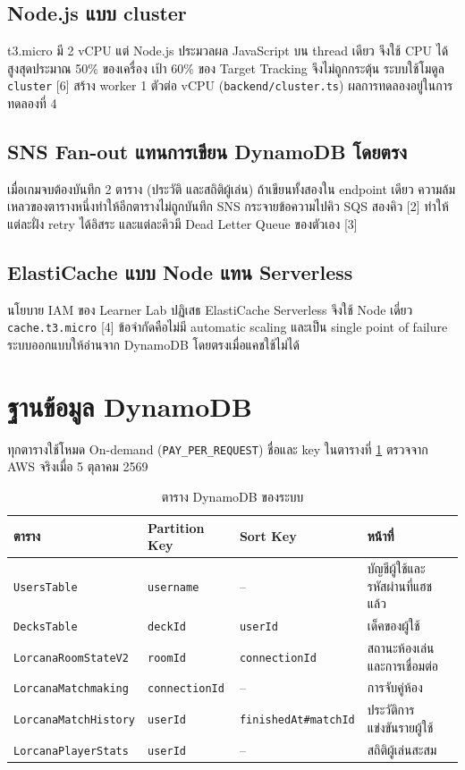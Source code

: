 \subsection{Node.js แบบ cluster}

t3.micro มี 2 vCPU แต่ Node.js ประมวลผล JavaScript บน thread เดียว จึงใช้ CPU ได้สูงสุดประมาณ 50\% ของเครื่อง เป้า 60\% ของ Target Tracking จึงไม่ถูกกระตุ้น ระบบใช้โมดูล \texttt{cluster} [6] สร้าง worker 1 ตัวต่อ vCPU (\texttt{backend/cluster.ts}) ผลการทดลองอยู่ในการทดลองที่ 4

\subsection{SNS Fan-out แทนการเขียน DynamoDB โดยตรง}

เมื่อเกมจบต้องบันทึก 2 ตาราง (ประวัติ และสถิติผู้เล่น) ถ้าเขียนทั้งสองใน endpoint เดียว ความล้มเหลวของตารางหนึ่งทำให้อีกตารางไม่ถูกบันทึก SNS กระจายข้อความไปคิว SQS สองคิว [2] ทำให้แต่ละฝั่ง retry ได้อิสระ และแต่ละคิวมี Dead Letter Queue ของตัวเอง [3]

\subsection{ElastiCache แบบ Node แทน Serverless}

นโยบาย IAM ของ Learner Lab ปฏิเสธ ElastiCache Serverless จึงใช้ Node เดี่ยว \texttt{cache.t3.micro} [4] ข้อจำกัดคือไม่มี automatic scaling และเป็น single point of failure ระบบออกแบบให้อ่านจาก DynamoDB โดยตรงเมื่อแคชใช้ไม่ได้

\section{ฐานข้อมูล DynamoDB}

ทุกตารางใช้โหมด On-demand (\texttt{PAY\_PER\_REQUEST}) ชื่อและ key ในตารางที่ \ref{tab:dynamodb_schema} ตรวจจาก AWS จริงเมื่อ 5 ตุลาคม 2569

\begin{table}[H]
\centering
\caption{ตาราง DynamoDB ของระบบ}
\label{tab:dynamodb_schema}
\small
\begin{tabularx}{\textwidth}{llllX}
\toprule
\textbf{ตาราง} & \textbf{Partition Key} & \textbf{Sort Key} & \textbf{หน้าที่} \\
\midrule
\texttt{UsersTable} & \texttt{username} & -- & บัญชีผู้ใช้และรหัสผ่านที่แฮชแล้ว \\
\texttt{DecksTable} & \texttt{deckId} & \texttt{userId} & เด็คของผู้ใช้ \\
\texttt{LorcanaRoomStateV2} & \texttt{roomId} & \texttt{connectionId} & สถานะห้องเล่นและการเชื่อมต่อ \\
\texttt{LorcanaMatchmaking} & \texttt{connectionId} & -- & การจับคู่ห้อง \\
\texttt{LorcanaMatchHistory} & \texttt{userId} & \texttt{finishedAt\#matchId} & ประวัติการแข่งขันรายผู้ใช้ \\
\texttt{LorcanaPlayerStats} & \texttt{userId} & -- & สถิติผู้เล่นสะสม \\
\bottomrule
\end{tabularx}
\end{table}

